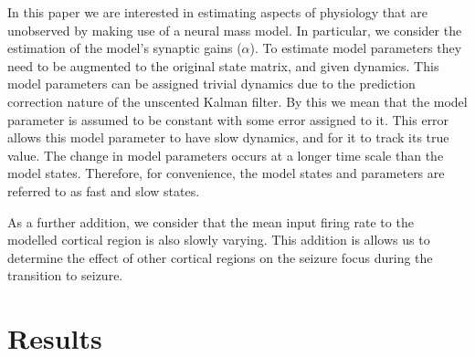 \documentclass[10pt]{article}%
\newcommand\red{\textcolor{red}}
\begin{document}




In this paper we are interested in estimating aspects of physiology that are unobserved by making use of a neural mass model. In particular, we consider the estimation of the model's synaptic gains ($\alpha$). To estimate model parameters they need to be augmented to the original state matrix, and given dynamics. This model parameters can be assigned trivial dynamics due to the prediction correction nature of the unscented Kalman filter. By this we mean that the model parameter is assumed to be constant with some error assigned to it. This error allows this model parameter to have slow dynamics, and for it to track its true value. The change in model parameters occurs at a longer time scale than the model states. Therefore, for convenience, the model states and parameters are referred to as fast and slow states. 

As a further addition, we consider that the mean input firing rate to the modelled cortical region is also slowly varying. This addition is allows us to determine the effect of other cortical regions on the seizure focus during the transition to seizure.


\section{Results}
\end{document}
